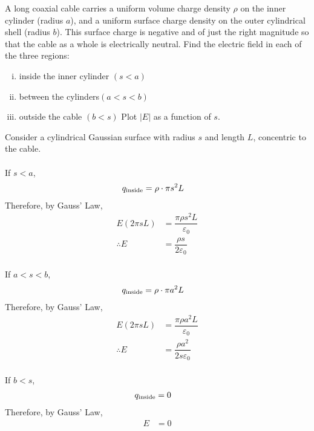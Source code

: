 \documentclass[fleqn, a4paper, 12pt, oneside]{amsart}
\theoremstyle{definition}
\theoremstyle{theorem}
\begin{document}
\begin{question}
	A long coaxial cable carries a uniform volume charge density $\rho$ on the inner cylinder (radius $a$), and a uniform surface charge density on the outer cylindrical shell (radius $b$). This surface charge is negative and of just the right magnitude so that the cable as a whole is electrically neutral. Find the electric field in each of the three regions:
	\begin{enumerate}[(i)]
		\item inside the inner cylinder $(s < a)$
		\item between the cylinders$ (a < s < b)$
		\item outside the cable $(b < s)$
		Plot $|E|$ as a function of $s$.
	\end{enumerate}
\end{question}

\begin{solution}
	Consider a cylindrical Gaussian surface with radius $s$ and length $L$, concentric to the cable.\\
	~\\
	If $s < a$,
	\begin{align*}
		q_{\textnormal{inside}} &= \rho \cdot \pi s^2 L
	\end{align*}
	Therefore, by Gauss' Law,
	\begin{align*}
		E (2 \pi s L) &= \dfrac{\pi \rho s^2 L}{\varepsilon_0}\\
		\therefore E &= \dfrac{\rho s}{2 \varepsilon_0}
	\end{align*}
	~\\
	If $a < s < b$,
	\begin{align*}
		q_{\textnormal{inside}} &= \rho \cdot \pi a^2 L
	\end{align*}
	Therefore, by Gauss' Law,
	\begin{align*}
		E (2 \pi s L) &= \dfrac{\pi \rho a^2 L}{\varepsilon_0}\\
		\therefore E &= \dfrac{\rho a^2}{2 s \varepsilon_0}
	\end{align*}
	~\\
	If $b < s$,
	\begin{align*}
		q_{\textnormal{inside}} &= 0
	\end{align*}
	Therefore, by Gauss' Law, 
	\begin{align*}
		E &= 0
	\end{align*}
	\begin{figure}[H]
	\end{figure}
\end{solution}
\end{document}
